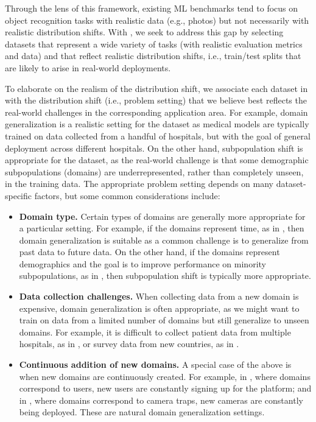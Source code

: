 Through the lens of this framework, existing ML benchmarks tend to focus on object recognition tasks with realistic data (e.g., photos) but not necessarily with realistic distribution shifts.
With \Wilds, we seek to address this gap by selecting datasets that represent a wide variety of tasks (with realistic evaluation metrics and data) and that reflect realistic distribution shifts, i.e., train/test splits that are likely to arise in real-world deployments.

To elaborate on the realism of the distribution shift, we associate each dataset in \Wilds with the distribution shift (i.e., problem setting) that we believe best reflects the real-world challenges in the corresponding application area.
For example, domain generalization is a realistic setting for the \Camelyon dataset as medical models are typically trained on data collected from a handful of hospitals, but with the goal of general deployment across different hospitals.
On the other hand, subpopulation shift is appropriate for the \CivilComments dataset, as the real-world challenge is that some demographic subpopulations (domains) are underrepresented, rather than completely unseen, in the training data.
The appropriate problem setting depends on many dataset-specific factors, but some common considerations include:
\begin{itemize}
  \item \textbf{Domain type.} Certain types of domains are generally more appropriate for a particular setting. For example, if the domains represent time, as in \FMoW, then domain generalization is suitable as a common challenge is to generalize from past data to future data.
  On the other hand, if the domains represent demographics and the goal is to improve performance on minority subpopulations, as in \CivilComments, then subpopulation shift is typically more appropriate.
  \item \textbf{Data collection challenges.} When collecting data from a new domain is expensive, domain generalization is often appropriate, as we might want to train on data from a limited number of domains but still generalize to unseen domains. For example, it is difficult to collect patient data from multiple hospitals, as in \Camelyon, or survey data from new countries, as in \PovertyMap.
  \item \textbf{Continuous addition of new domains.} A special case of the above is when new domains are continuously created. For example, in \Amazon, where domains correspond to users,  new users are constantly signing up for the platform; and in \iWildCam, where domains correspond to camera traps, new cameras are constantly being deployed. These are natural domain generalization settings.
\end{itemize}
